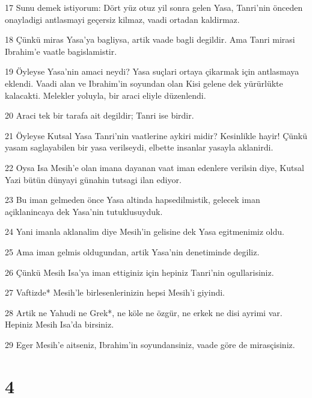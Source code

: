 \par 17 Sunu demek istiyorum: Dört yüz otuz yil sonra gelen Yasa, Tanri'nin önceden onayladigi antlasmayi geçersiz kilmaz, vaadi ortadan kaldirmaz.
\par 18 Çünkü miras Yasa'ya bagliysa, artik vaade bagli degildir. Ama Tanri mirasi Ibrahim'e vaatle bagislamistir.
\par 19 Öyleyse Yasa'nin amaci neydi? Yasa suçlari ortaya çikarmak için antlasmaya eklendi. Vaadi alan ve Ibrahim'in soyundan olan Kisi gelene dek yürürlükte kalacakti. Melekler yoluyla, bir araci eliyle düzenlendi.
\par 20 Araci tek bir tarafa ait degildir; Tanri ise birdir.
\par 21 Öyleyse Kutsal Yasa Tanri'nin vaatlerine aykiri midir? Kesinlikle hayir! Çünkü yasam saglayabilen bir yasa verilseydi, elbette insanlar yasayla aklanirdi.
\par 22 Oysa Isa Mesih'e olan imana dayanan vaat iman edenlere verilsin diye, Kutsal Yazi bütün dünyayi günahin tutsagi ilan ediyor.
\par 23 Bu iman gelmeden önce Yasa altinda hapsedilmistik, gelecek iman açiklanincaya dek Yasa'nin tutuklusuyduk.
\par 24 Yani imanla aklanalim diye Mesih'in gelisine dek Yasa egitmenimiz oldu.
\par 25 Ama iman gelmis oldugundan, artik Yasa'nin denetiminde degiliz.
\par 26 Çünkü Mesih Isa'ya iman ettiginiz için hepiniz Tanri'nin ogullarisiniz.
\par 27 Vaftizde* Mesih'le birlesenlerinizin hepsi Mesih'i giyindi.
\par 28 Artik ne Yahudi ne Grek*, ne köle ne özgür, ne erkek ne disi ayrimi var. Hepiniz Mesih Isa'da birsiniz.
\par 29 Eger Mesih'e aitseniz, Ibrahim'in soyundansiniz, vaade göre de mirasçisiniz.

\chapter{4}

